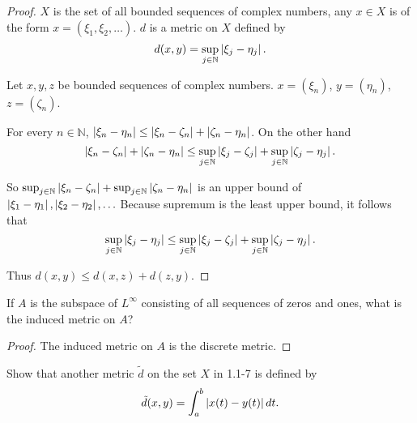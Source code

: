 \begin{proof}
    $X$ is the set of all bounded sequences of complex numbers, any $x\in X$ is of the form $x = (\xi_{1}, \xi_{2}, \ldots)$. $d$ is a metric on $X$ defined by
    \[
        d(x, y) = \sup_{j\in\mathbb{N}}\left\vert{\xi_{j} - \eta_{j}}\right\vert.
    \]

    Let $x, y, z$ be bounded sequences of complex numbers. $x = {(\xi_{n})}$, $y = {(\eta_{n})}$, $z = (\zeta_{n})$.

    For every $n\in\mathbb{N}$, $\left\vert{\xi_{n} - \eta_{n}}\right\vert\leq \left\vert{\xi_{n} - \zeta_{n}}\right\vert + \left\vert{\zeta_{n} - \eta_{n}}\right\vert$. On the other hand
    \[
        \left\vert{\xi_{n} - \zeta_{n}}\right\vert + \left\vert{\zeta_{n} - \eta_{n}}\right\vert \leq \sup_{j\in\mathbb{N}}\left\vert{\xi_{j} - \zeta_{j}}\right\vert + \sup_{j\in\mathbb{N}}\left\vert{\zeta_{j} - \eta_{j}}\right\vert.
    \]

    So $\sup_{j\in\mathbb{N}}\left\vert{\xi_{n} - \zeta_{n}}\right\vert + \sup_{j\in\mathbb{N}}\left\vert{\zeta_{n} - \eta_{n}}\right\vert$ is an upper bound of $\left\vert{\xi_{1} - \eta_{1}}\right\vert, \left\vert{\xi_{2} - \eta_{2}}\right\vert, \ldots$ Because supremum is the least upper bound, it follows that
    \[
        \sup_{j\in\mathbb{N}}\left\vert{\xi_{j} - \eta_{j}}\right\vert \leq \sup_{j\in\mathbb{N}}\left\vert{\xi_{j} - \zeta_{j}}\right\vert + \sup_{j\in\mathbb{N}}\left\vert{\zeta_{j} - \eta_{j}}\right\vert.
    \]

    Thus $d(x, y)\leq d(x, z) + d(z, y)$.
\end{proof}

\begin{exercise}\label{chapter1:section1:exercise7}
    If $A$ is the subspace of $L^{\infty}$ consisting of all sequences of zeros and ones, what is the induced metric on $A$?
\end{exercise}

\begin{proof}
    The induced metric on $A$ is the discrete metric.
\end{proof}

\begin{exercise}\label{chapter1:section1:exercise8}
    Show that another metric $\tilde{d}$ on the set $X$ in 1.1-7 is defined by
    \[
        \tilde{d}(x, y) = \int^{b}_{a}\left\vert{x(t) - y(t)}\right\vert dt.
    \]
\end{exercise}


